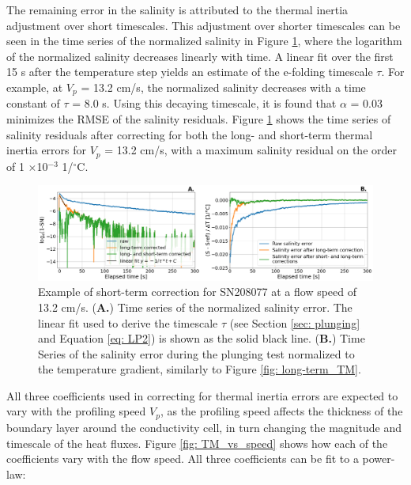 \documentclass{ametsocV6.1}
\begin{document}
The remaining error in the salinity is attributed to the thermal inertia adjustment over short timescales.  This adjustment over shorter timescales can be seen in the time series of the normalized salinity in Figure \ref{fig: short-term_TM}, where the logarithm of the normalized salinity decreases linearly with time. 
A linear fit over the first 15 s after the temperature step yields an estimate of the e-folding timescale $\tau$. For example, at $V_p$ = 13.2 cm/s, the normalized salinity decreases with a time constant of $\tau$ = 8.0 s.  Using this decaying timescale,  it is found that $\alpha$ = 0.03 minimizes the RMSE of the salinity residuals. 
Figure \ref{fig: short-term_TM} shows the time series of salinity residuals after correcting for both the long- and short-term thermal inertia errors for $V_p$ = 13.2 cm/s, with a maximum salinity residual on the order of 1 $\times$10$^{-3}$ 1/$^\circ$C.

\begin{figure}[t]
	\centering
	\includegraphics[width=\linewidth]{Fig10_short_term_TM}
	\caption{Example of short-term correction for SN208077 at a flow speed of 13.2 cm/s. (\textbf{A.}) Time series of the normalized salinity error. The linear fit used to derive the timescale $\tau$ (see Section \ref{sec: plunging} and Equation \ref{eq: LP2}) is shown as the solid black line. (\textbf{B.}) Time Series of the salinity error during the plunging test normalized to the temperature gradient, similarly to Figure \ref{fig: long-term_TM}.}
	\label{fig: short-term_TM}
\end{figure}

All three coefficients used in correcting for thermal inertia errors are expected to vary with the profiling speed $V_p$, as the profiling speed affects the thickness of the boundary layer around the conductivity cell, in turn changing the magnitude and timescale of the heat fluxes\citep{Lueck_1990a, Morison_1994}. 
Figure \ref{fig: TM_vs_speed} shows how each of the coefficients vary with the flow speed. 
All three coefficients can be fit to a power-law:
\end{document}
